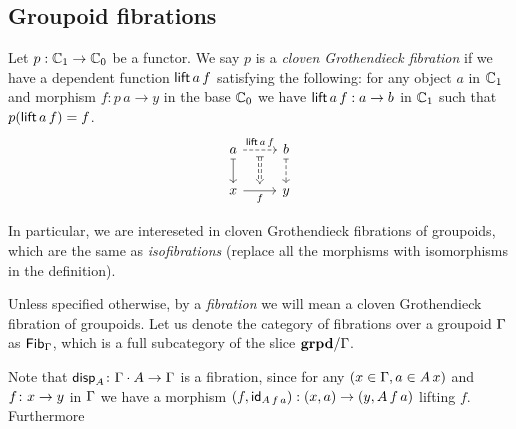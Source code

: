 \medskip

\subsection{Groupoid fibrations}

\begin{defn}[Fibration]
  Let $p : \mathbb{C}_{1} \to \mathbb{C}_{0}$ be a functor.
  We say $p$ is a \textit{cloven Grothendieck fibration}
  if we have a dependent function $\mathsf{lift} \, a \, f$ satisfying the following:
  for any object $a$ in $\mathbb{C}_{1}$ and morphism $f : p \, a \to y$
  in the base $\mathbb{C}_{0}$
  we have $\mathsf{lift} \, a \, f : a \to b$ in $\mathbb{C}_{1}$ such that $p (\mathsf{lift} \, a \, f) = f$.
  \[\begin{tikzcd}
    a & b \\
    x & y
    \arrow[""{name=0, anchor=center, inner sep=0}, "{\lift{a}{f}}", dashed, from=1-1, to=1-2]
    \arrow[maps to, from=1-1, to=2-1]
    \arrow[dashed, maps to, from=1-2, to=2-2]
    \arrow[""{name=1, anchor=center, inner sep=0}, "f"', from=2-1, to=2-2]
    \arrow[shorten <=4pt, shorten >=4pt, Rightarrow, dashed, maps to, from=0, to=1]
  \end{tikzcd}\]

  In particular, we are intereseted in cloven Grothendieck fibrations of groupoids,
  which are the same as \textit{isofibrations}
  (replace all the morphisms with isomorphisms in the definition).

  Unless specified otherwise,
  by a \textit{fibration} we will mean a cloven Grothendieck fibration of groupoids.
  Let us denote the category of fibrations over a groupoid $\Gamma$ as $\mathsf{Fib}_{\Gamma}$,
  which is a full subcategory of the slice $\mathbf{grpd} / \Gamma$.
\end{defn}

\medskip

Note that $\mathsf{disp}_{A} \colon \Gamma \cdot A \to \Gamma$ is a fibration,
since for any $(x \in \Gamma, a \in A \, x)$ and $f \colon x \to y$ in $\Gamma$
we have a morphism $(f, \mathsf{id}_{A \, f \, a}) : (x, a) \to (y, A \, f \, a)$
lifting $f$. Furthermore

